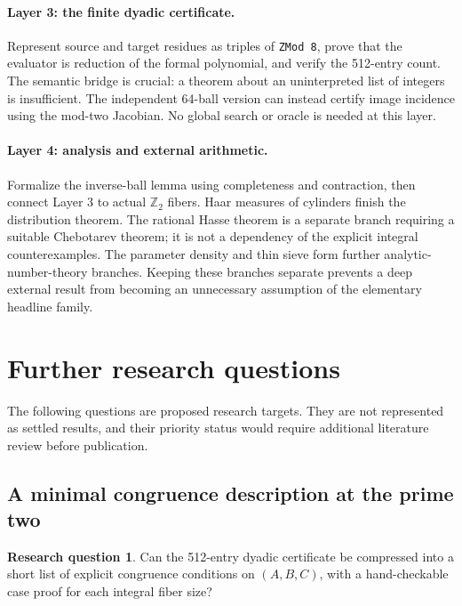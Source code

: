 \documentclass[11pt]{article}
\numberwithin{equation}{section}
\theoremstyle{plain}
\theoremstyle{plain}
\theoremstyle{plain}
\theoremstyle{definition}
\theoremstyle{definition}
\newtheorem{question}[question]{Research question}
\theoremstyle{definition}
\theoremstyle{remark}
\newcommand{\Z}{\mathbb Z}\newcommand{\Q}{\mathbb Q}
\begin{document}
\paragraph{Layer 3: the finite dyadic certificate.}
Represent source and target residues as triples of \texttt{ZMod 8}, prove
that the evaluator is reduction of the formal polynomial, and verify the
512-entry count. The semantic bridge is crucial: a theorem about an
uninterpreted list of integers is insufficient. The independent 64-ball
version can instead certify image incidence using the mod-two Jacobian.
No global search or oracle is needed at this layer.

\paragraph{Layer 4: analysis and external arithmetic.}
Formalize the inverse-ball lemma using completeness and contraction,
then connect Layer 3 to actual $\Z_2$ fibers. Haar measures of cylinders
finish the distribution theorem. The rational Hasse theorem is a separate
branch requiring a suitable Chebotarev theorem; it is not a dependency of
the explicit integral counterexamples. The parameter density and thin
sieve form further analytic-number-theory branches. Keeping these
branches separate prevents a deep external result from becoming an
unnecessary assumption of the elementary headline family.

\section{Further research questions}\label{alg:sec:questions}
The following questions are proposed research targets. They are not
represented as settled results, and their priority status would require
additional literature review before publication.

\subsection{A minimal congruence description at the prime two}\label{alg:sub:q-dyadic}
\begin{question}
Can the 512-entry dyadic certificate be compressed into a short list of
explicit congruence conditions on $(A,B,C)$, with a hand-checkable
case proof for each integral fiber size?
\end{question}
\noindent[Added 30 September 2026, batch~64: partly answered, for image
membership only, by Part~III: Proposition~\ref{alg:ns:prop:two} compresses
membership in $F(\Z_2^3)$ to the five-row table $E(A,B,C)$ of congruences
modulo $8$. The integral fiber sizes $j=1,2,3$ are not compressed, and
that proof is still the exhaustive $512$-case check.]
\end{document}
